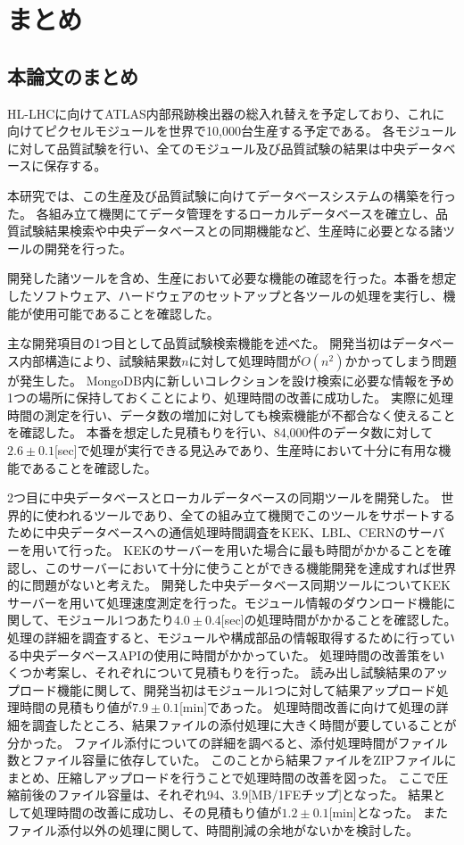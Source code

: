 \chapter{まとめ}

\section{本論文のまとめ}
HL-LHCに向けてATLAS内部飛跡検出器の総入れ替えを予定しており、これに向けてピクセルモジュールを世界で10,000台生産する予定である。
各モジュールに対して品質試験を行い、全てのモジュール及び品質試験の結果は中央データベースに保存する。

本研究では、この生産及び品質試験に向けてデータベースシステムの構築を行った。
各組み立て機関にてデータ管理をするローカルデータベースを確立し、品質試験結果検索や中央データベースとの同期機能など、生産時に必要となる諸ツールの開発を行った。

開発した諸ツールを含め、生産において必要な機能の確認を行った。本番を想定したソフトウェア、ハードウェアのセットアップと各ツールの処理を実行し、機能が使用可能であることを確認した。

主な開発項目の1つ目として品質試験検索機能を述べた。
開発当初はデータベース内部構造により、試験結果数$n$に対して処理時間が$O(n^2)$かかってしまう問題が発生した。
MongoDB内に新しいコレクションを設け検索に必要な情報を予め1つの場所に保持しておくことにより、処理時間の改善に成功した。
実際に処理時間の測定を行い、データ数の増加に対しても検索機能が不都合なく使えることを確認した。
本番を想定した見積もりを行い、84,000件のデータ数に対して$2.6\pm0.1$[sec]で処理が実行できる見込みであり、生産時において十分に有用な機能であることを確認した。

2つ目に中央データベースとローカルデータベースの同期ツールを開発した。
世界的に使われるツールであり、全ての組み立て機関でこのツールをサポートするために中央データベースへの通信処理時間調査をKEK、LBL、CERNのサーバーを用いて行った。
KEKのサーバーを用いた場合に最も時間がかかることを確認し、このサーバーにおいて十分に使うことができる機能開発を達成すれば世界的に問題がないと考えた。
開発した中央データベース同期ツールについてKEKサーバーを用いて処理速度測定を行った。モジュール情報のダウンロード機能に関して、モジュール1つあたり$4.0\pm 0.4$[sec]の処理時間がかかることを確認した。
処理の詳細を調査すると、モジュールや構成部品の情報取得するために行っている中央データベースAPIの使用に時間がかかっていた。
処理時間の改善策をいくつか考案し、それぞれについて見積もりを行った。
読み出し試験結果のアップロード機能に関して、開発当初はモジュール1つに対して結果アップロード処理時間の見積もり値が$7.9 ± 0.1$[min]であった。
処理時間改善に向けて処理の詳細を調査したところ、結果ファイルの添付処理に大きく時間が要していることが分かった。
ファイル添付についての詳細を調べると、添付処理時間がファイル数とファイル容量に依存していた。
このことから結果ファイルをZIPファイルにまとめ、圧縮しアップロードを行うことで処理時間の改善を図った。
ここで圧縮前後のファイル容量は、それぞれ94、3.9[MB/1FEチップ]となった。
結果として処理時間の改善に成功し、その見積もり値が$1.2\pm 0.1$[min]となった。
またファイル添付以外の処理に関して、時間削減の余地がないかを検討した。

